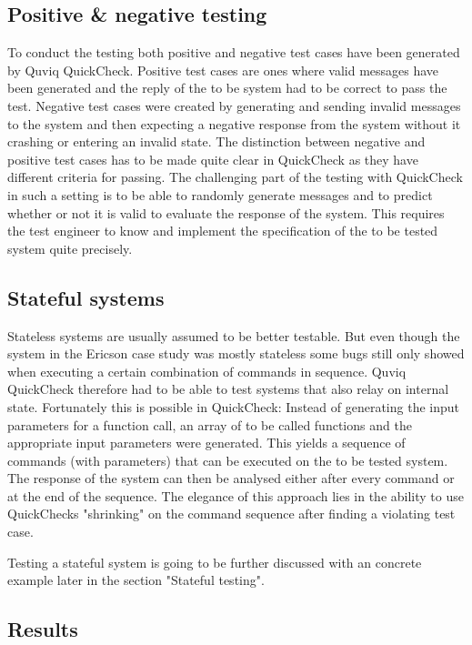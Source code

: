 \documentclass[a4paper, 12pt]{article} %
\begin{document}
\subsection{Positive \& negative testing}

To conduct the testing both positive and negative test cases have been generated by Quviq QuickCheck. Positive test cases are ones where valid messages have been generated and the reply of the to be system had to be correct to pass the test. Negative test cases were created by generating and sending invalid messages to the system and then expecting a negative response from the system without it crashing or entering an invalid state. The distinction between negative and positive test cases has to be made quite clear in QuickCheck as they have different criteria for passing. The challenging part of the testing with QuickCheck in such a setting is to be able to randomly generate messages and to predict whether or not it is valid to evaluate the response of the system. This requires the test engineer to know and implement the specification of the to be tested system quite precisely. \cite{Arts06}

\subsection{Stateful systems}

Stateless systems are usually assumed to be better testable. But even though the system in the Ericson case study was mostly stateless some bugs still only showed when executing a certain combination of commands in sequence. Quviq QuickCheck therefore had to be able to test systems that also relay on internal state. Fortunately this is possible in QuickCheck: Instead of generating the input parameters for a function call, an array of to be called functions and the appropriate input parameters were generated. This yields a sequence of commands (with parameters) that can be executed on the to be tested system. The response of the system can then be analysed either after every command or at the end of the sequence. The elegance of this approach lies in the ability to use QuickChecks "shrinking" on the command sequence after finding a violating test case. \cite{Arts06} 

Testing a stateful system is going to be further discussed with an concrete example later in the section "Stateful testing".

\subsection{Results}
\end{document}
